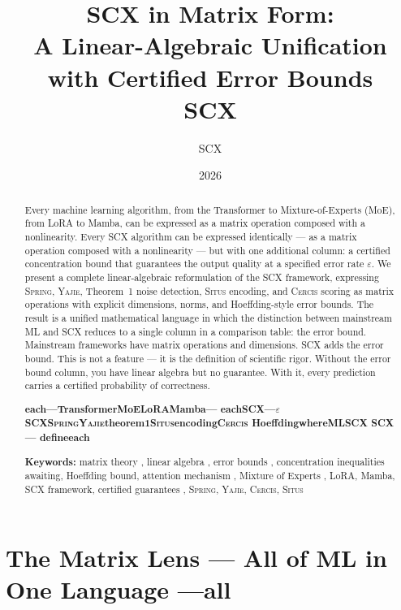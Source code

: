 \documentclass[12pt,a4paper]{article}
\title{\textbf{SCX in Matrix Form:}\\[4pt]
       \large A Linear-Algebraic Unification with Certified Error Bounds\\[8pt]
       \normalsize \textbf{SCX}}
\author{SCX}
\date{2026}
\theoremstyle{definition}
\newcommand{\Situs}{\textsc{Situs}}
\newcommand{\Yajie}{\textsc{Yajie}}
\newcommand{\Spring}{\textsc{Spring}}
\newcommand{\Cercis}{\textsc{Cercis}}
\newcommand{\SCX}{\textsc{SCX}}
\begin{document}
\maketitle

\begin{abstract}
\noindent
Every machine learning algorithm, from the Transformer to Mixture-of-Experts (MoE), 
from LoRA to Mamba, can be expressed as a matrix operation composed with a 
nonlinearity. Every \SCX{} algorithm can be expressed identically — as a matrix 
operation composed with a nonlinearity — but with one additional column: a 
certified concentration bound that guarantees the output quality at a specified 
error rate $\varepsilon$. We present a complete linear-algebraic reformulation of 
the \SCX{} framework, expressing \Spring{}, \Yajie{}, Theorem~1 noise detection, 
\Situs{} encoding, and \Cercis{} scoring as matrix operations with explicit 
dimensions, norms, and Hoeffding-style error bounds. The result is a unified 
mathematical language in which the distinction between mainstream ML and \SCX{} 
reduces to a single column in a comparison table: the error bound. Mainstream 
frameworks have matrix operations and dimensions. \SCX{} adds the error bound. 
This is not a feature — it is the definition of scientific rigor. Without the 
error bound column, you have linear algebra but no guarantee. With it, every 
prediction carries a certified probability of correctness.

\medskip
\noindent\textbf{
each---TransformerMoELoRAMamba---
eachSCX---$\varepsilon$
SCX\Spring{}\Yajie{}theorem1\Situs{}encoding\Cercis{}
HoeffdingwhereMLSCX
SCX---
defineeach}

\medskip
\noindent\textbf{Keywords:} matrix theory , linear algebra , 
error bounds , concentration inequalities awaiting, 
Hoeffding bound, attention mechanism , 
Mixture of Experts , LoRA, Mamba, SCX framework, 
certified guarantees , \Spring{}, \Yajie{}, \Cercis{}, \Situs{}
\end{abstract}

\section{The Matrix Lens — All of ML in One Language ---all}
\label{sec:matrix_lens}
\end{document}
